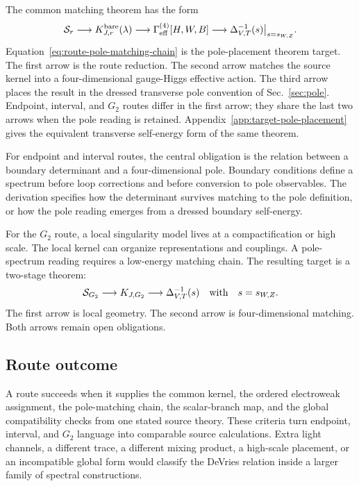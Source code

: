 The common matching theorem has the form
\begin{equation}
  \mathcal S_r
  \longrightarrow
  K_{J,r}^{\rm bare}(\lambda)
  \longrightarrow
  \Gamma_{\rm eff}^{(4)}[H,W,B]
  \longrightarrow
  \Delta^{-1}_{V,T}(s)
  \big|_{s=s_{W,Z}} .
  \label{eq:route-pole-matching-chain}
\end{equation}
Equation~\eqref{eq:route-pole-matching-chain} is the pole-placement theorem
target.  The first arrow is the route reduction.  The second arrow matches the source
kernel into a four-dimensional gauge-Higgs effective action.  The third arrow
places the result in the dressed transverse pole convention of Sec.~\ref{sec:pole}.
Endpoint, interval, and \(G_2\) routes differ in the first arrow; they share
the last two arrows when the pole reading is retained.
Appendix~\ref{app:target-pole-placement} gives the equivalent transverse
self-energy form of the same theorem.

For endpoint and interval routes, the central obligation is the relation between
a boundary determinant and a four-dimensional pole.  Boundary conditions define
a spectrum before loop corrections and before conversion to pole observables.
The derivation specifies how the determinant survives matching to the pole
definition, or how the pole reading emerges from a dressed boundary
self-energy.

For the \(G_2\) route, a local singularity model lives at a compactification or
high scale.  The local kernel can organize representations and couplings.  A
pole-spectrum reading requires a low-energy matching chain.  The resulting
target is a two-stage theorem:
\begin{equation}
  \mathcal S_{G_2}
  \longrightarrow
  K_{J,G_2}
  \longrightarrow
  \Delta^{-1}_{V,T}(s)
  \quad\hbox{with}\quad
  s=s_{W,Z}.
  \label{eq:g2-two-stage-pole}
\end{equation}
The first arrow is local geometry.  The second arrow is four-dimensional matching.  Both arrows remain open obligations.

\subsection{Route outcome}
\label{sec:route-outcome}

A route succeeds when it supplies the common kernel, the ordered
electroweak assignment, the pole-matching chain, the scalar-branch map, and
the global compatibility checks from one stated source theory.  These criteria
turn endpoint, interval, and \(G_2\) language into comparable source
calculations.  Extra light channels, a different trace, a different mixing product,
a high-scale placement, or an incompatible global form would classify the
DeVries relation inside a larger family of spectral constructions.
